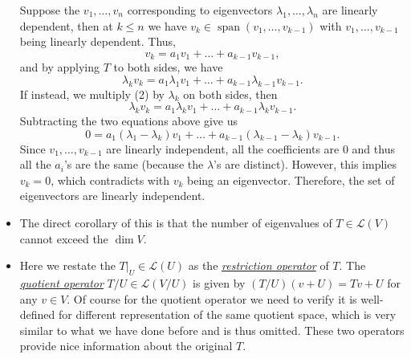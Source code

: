 \documentclass[11pt]{article}
\newcommand{\df}[1]{\ul{\textit{\textsf{#1}}}}
\newcommand{\s}{\operatorname{span}}
\renewcommand{\d}{\dim}
\newcommand{\LV}{\mathcal{L}(V)}
\newcommand{\bv}{v_1,\dots,v_n}
\begin{document}
\begin{itemize}
    Suppose the $\bv$ corresponding to eigenvectors $\lambda_1,\dots,\lambda_n$ are linearly dependent, then at $k \leq n$ we have $v_k \in \s(v_1,\dots,v_{k-1})$ with $v_1,\dots,v_{k-1}$ being linearly dependent. Thus, 
    \begin{equation}
        v_k = a_1 v_1 + \dots + a_{k-1}v_{k-1},
    \end{equation}
    and by applying $T$ to both sides, we have $$\lambda_k v_k = a_1 \lambda_1 v_1 + \dots + a_{k-1} \lambda_{k-1}v_{k-1}.$$ If instead, we multiply (2) by $\lambda_k$ on both sides, then $$\lambda_k v_k = a_1 \lambda_k v_1 + \dots + a_{k-1} \lambda_k v_{k-1}.$$ Subtracting the two equations above give us $$0 = a_1 (\lambda_1 - \lambda_k) v_1 + \dots + a_{k-1} (\lambda_{k-1}-\lambda_k) v_{k-1}.$$ Since $v_1, \dots, v_{k-1}$ are linearly independent, all the coefficients are 0 and thus all the $a_i$'s are the same (because the $\lambda$'s are distinct). However, this implies $v_k = 0$, which contradicts with $v_k$ being an eigenvector. Therefore, the set of eigenvectors are linearly independent.
    \item The direct corollary of this is that the number of eigenvalues of $T \in \LV$ cannot exceed the $\d V$.
    \item Here we restate the $T|_U \in \mathcal{L}(U)$ as the \df{restriction operator} of $T$. The \df{quotient operator} $T/U \in \mathcal{L}(V/U)$ is given by $(T/U)(v+U) = Tv+U$ for any $v \in V$. Of course for the quotient operator we need to verify it is well-defined for different representation of the same quotient space, which is very similar to what we have done before and is thus omitted. These two operators provide nice information about the original $T$.
\end{itemize}
\end{document}
